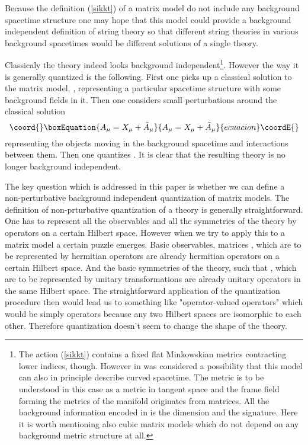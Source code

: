 \documentclass[a4paper,11pt]{article}
\begin{document}
Because the definition (\ref{sikkt}) of a matrix model do not
include any background spacetime structure one may hope that this
model could provide a background independent definition of string
theory so that different string theories in various background
spacetimes would be different solutions of a single theory.

Classicaly the theory indeed looks background
independent\footnote[1]{The action (\ref{sikkt}) contains a fixed
flat Minkowskian metrics \myHighlight{$\eta^{\mu \nu}$}\coordHE{} contracting lower
indices, though. However in \cite{stiib} was considered a
possibility that this model can also in principle describe curved
spacetime. The metric \myHighlight{$\eta^{\mu \nu}$}\coordHE{} is to be understood in this
case as a metric in tangent space and the frame field forming the
metrics of the manifold originates from matrices. All the
background information encoded in \myHighlight{$\eta^{\mu \nu}$}\coordHE{} is the
dimension and the signature. Here it is worth mentioning also
cubic matrix models \cite{cmm} which do not depend on any
background metric structure at all.}. However the way it is
generally quantized is the following. First one picks up a
classical solution to the matrix model, \coordHE{},
representing a particular spacetime structure with some background
fields in it. Then one considers small perturbations around the
classical solution
\begin{equation}\coord{}\boxEquation{
A_\mu=X_\mu+\tilde A_\mu
}{
A_\mu=X_\mu+\tilde A_\mu
}{ecuacion}\coordE{}\end{equation}
representing the objects moving in the background spacetime and
interactions between them. Then one quantizes \coordHE{}. It
is clear that the resulting theory is no longer background
independent.

The key question which is addressed in this paper is whether we
can define a non-perturbative background independent quantization
of matrix models. The definition of non-prturbative quantization
of a theory is generally straightforward. One has to represent all
the observables and all the symmetries of the theory by operators
on a certain Hilbert space. However when we try to apply this to a
matrix model a certain puzzle emerges. Basic observables, matrices
\coordHE{}, which are to be represented by hermitian operators are
already hermitian operators on a certain Hilbert space. And the
basic symmetries of the theory, \coordHE{} such that \coordHE{}, which are to be represented by unitary
transformations are already unitary operators in the same Hilbert
space. The straightforward application of the quantization
procedure then would lead us to something like "operator-valued
operators" which would be simply operators because any two Hilbert
spaces are isomorphic to each other. Therefore quantization
doesn't seem to change the shape of the theory.
\end{document}
